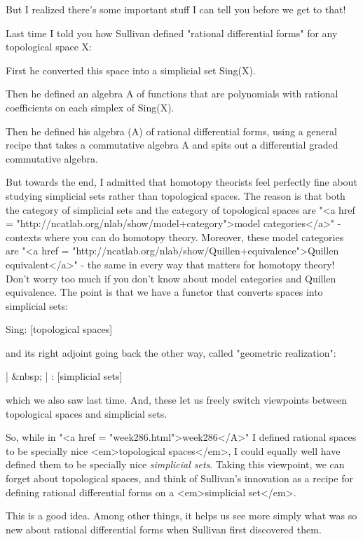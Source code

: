 But I realized there's some important stuff I can tell you 
before we get to that!  

Last time I told you how Sullivan defined "rational differential
forms" for any topological space X:

  First he converted this space into a simplicial set Sing(X).  

  Then he defined an algebra A of functions that are polynomials 
  with rational coefficients on each simplex of Sing(X).  

  Then he defined his algebra \Omega (A) of rational differential forms,
  using a general recipe that takes a commutative algebra A and spits
  out a differential graded commutative algebra.

But towards the end, I admitted that homotopy theorists feel perfectly
fine about studying simplicial sets rather than topological spaces.
The reason is that both the category of simplicial sets
and the category of topological spaces are "<a href = 
"http://ncatlab.org/nlab/show/model+category">model categories</a>" - 
contexts where you can do homotopy theory.  
Moreover, these model categories are "<a href = 
"http://ncatlab.org/nlab/show/Quillen+equivalence">Quillen 
equivalent</a>" - the same in every way that
matters for homotopy theory!  Don't worry too much if you don't know
about model categories and Quillen equivalence.  The point is that we
have a functor that converts spaces into simplicial sets:

Sing: [topological spaces] 

and its right adjoint going back the other way, called "geometric
realization":

| &nbsp; | : [simplicial sets] 


which we also saw last time.  And, these let us freely switch
viewpoints between topological spaces and simplicial sets.

So, while in "<a href = "week286.html">week286</A>" I
defined rational spaces to be specially nice <em>topological
spaces</em>, I could equally well have defined them to be specially
nice \emph{simplicial sets}.  Taking this viewpoint, we can forget
about topological spaces, and think of Sullivan's innovation as a
recipe for defining rational differential forms on a <em>simplicial
set</em>.

This is a good idea.  Among other things, it helps us see more simply
what was so new about rational differential forms when Sullivan first
discovered them.

